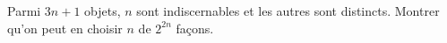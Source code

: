Parmi $3n + 1$ objets, $n$ sont indiscernables et les autres sont distincts. Montrer qu'on peut en choisir $n$ de $2^{2n}$ façons.
